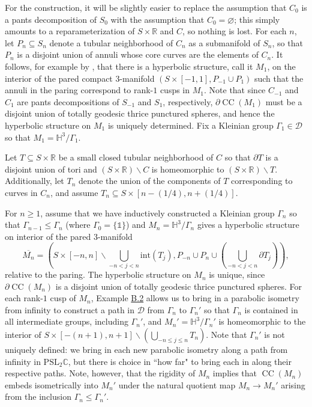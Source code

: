 \documentclass[11pt,leqno]{article}
\DeclareMathOperator{\CC}{CC}
\theoremstyle{introdef}
\numberwithin{lemma}{section}
\theoremstyle{definition}
\newcommand{\R}{\mathbb{R}}
\newcommand{\C}{\mathbb{C}}
\begin{document}
For the construction, it will be slightly easier to replace the assumption that $C_0$ is a pants decomposition of $S_0$ with the assumption that $C_0=\varnothing$; this simply amounts to a reparameterization of $S\times\R$ and $C$, so nothing is lost. For each $n$, let $P_n\subseteq S_n$ denote a tubular neighborhood of $C_n$ as a submanifold of $S_n$, so that $P_n$ is a disjoint union of annuli whose core curves are the elements of $C_n$. It follows, for example by \cite[Theorem 6.4]{THUII}, that there is a hyperbolic structure, call it $M_1$, on the interior of the pared compact $3$-manifold $(S\times[-1,1],P_{-1}\cup P_{1})$ such that the annuli in the paring correspond to rank-$1$ cusps in $M_1$. Note that since $C_{-1}$ and $C_{1}$ are pants decompositions of $S_{-1}$ and $S_1$, respectively, $\partial \CC(M_1)$ must be a disjoint union of totally geodesic thrice punctured spheres, and hence the hyperbolic structure on $M_1$ is uniquely determined. Fix a Kleinian group $\Gamma_1\in\mathcal{D}$ so that $M_1=\mathbb{H}^3/\Gamma_1$. \par

Let $T\subseteq S\times\R$ be a small closed tubular neighborhood of $C$ so that $\partial T$ is a disjoint union of tori and $(S\times\R)\backslash C$ is homeomorphic to $(S\times \R)\backslash T$. Additionally, let $T_n$ denote the union of the components of $T$ corresponding to curves in $C_n$, and assume $T_n\subseteq S\times[n-(1/4),n+(1/4)].$\par

For $n\geq1$, assume that we have inductively constructed a Kleinian group $\Gamma_n$ so that $\Gamma_{n-1}\leq\Gamma_n$ (where $\Gamma_0=\{\mathds{1}\}$) and $M_n=\mathbb{H}^3/\Gamma_n$ gives a hyperbolic structure on interior of the pared $3$-manifold 
\begin{equation}\label{eq:paring}
    \overline{M_n}=(S\times[-n,n]\backslash\textstyle\bigcup_{-n< j<n} \mathrm{int}(T_j),P_{-n}\cup P_n\cup(\textstyle\bigcup_{-n<j<n}\partial T_j)),
    \tag{$\star$}
\end{equation}
 relative to the paring. The hyperbolic structure on $M_n$ is unique, since $\partial \CC(M_n)$ is a disjoint union of totally geodesic thrice punctured spheres. For each rank-$1$ cusp of $M_n$, Example \hyperlink{Ex-CuspRank}{B.2} allows us to bring in a parabolic isometry from infinity to construct a path in $\mathcal{D}$ from $\Gamma_n$ to $\Gamma_n'$ so that $\Gamma_n$ is contained in all intermediate groups, including $\Gamma_n'$, and $M_n'=\mathbb{H}^3/\Gamma_n'$ is homeomorphic to the interior of $S\times[-(n+1),n+1]\backslash(\bigcup_{-n\leq j\leq n} T_n)$. Note that $\Gamma_n'$ is not uniquely defined: we bring in each new parabolic isometry along a path from infinity in $\mathrm{PSL}_2\C$, but there is choice in ``how far" to bring each in along their respective paths. Note, however, that the rigidity of $M_n$ implies that $\CC(M_n)$ embeds isometrically into $M_n'$ under the natural quotient map $M_n\rightarrow M_n'$ arising from the inclusion $\Gamma_n\leq\Gamma_n'$.\par
\end{document}
